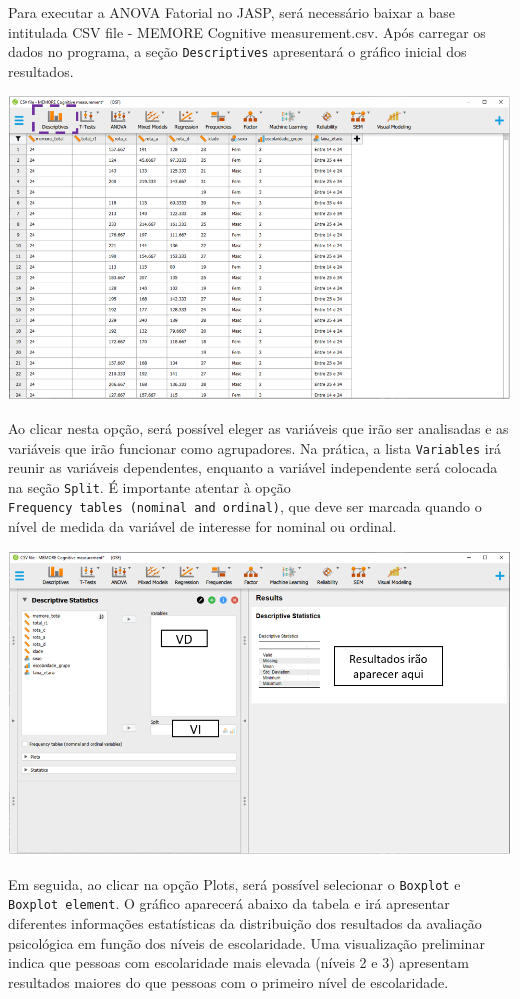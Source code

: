 \documentclass[
]{book}
\begin{document}
Para executar a ANOVA Fatorial no JASP, será necessário baixar a base intitulada CSV file - MEMORE Cognitive measurement.csv. Após carregar os dados no programa, a seção \texttt{Descriptives} apresentará o gráfico inicial dos resultados.

\includegraphics{./img/cap_anova_two_way_descriptives.png}

Ao clicar nesta opção, será possível eleger as variáveis que irão ser analisadas e as variáveis que irão funcionar como agrupadores. Na prática, a lista \texttt{Variables} irá reunir as variáveis dependentes, enquanto a variável independente será colocada na seção \texttt{Split}. É importante atentar à opção \texttt{Frequency\ tables\ (nominal\ and\ ordinal)}, que deve ser marcada quando o nível de medida da variável de interesse for nominal ou ordinal.

\includegraphics{./img/cap_anova_two_way_descriptives2.png}

Em seguida, ao clicar na opção Plots, será possível selecionar o \texttt{Boxplot} e \texttt{Boxplot\ element}. O gráfico aparecerá abaixo da tabela e irá apresentar diferentes informações estatísticas da distribuição dos resultados da avaliação psicológica em função dos níveis de escolaridade. Uma visualização preliminar indica que pessoas com escolaridade mais elevada (níveis 2 e 3) apresentam resultados maiores do que pessoas com o primeiro nível de escolaridade.
\end{document}
